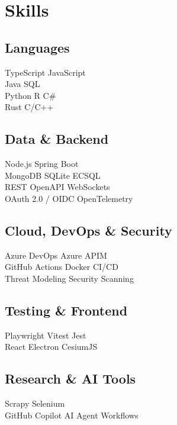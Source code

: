 \documentclass[]{deedy-resume-openfont}
\begin{document}
\begin{minipage}[t]{0.33\textwidth}

\section{Skills}
\subsection{Languages}
TypeScript \textbullet{} JavaScript \\
Java \textbullet{} SQL \\
Python \textbullet{} R \textbullet{} C\# \\
Rust \textbullet{} C/C++ \\
\sectionsep
\subsection{Data \& Backend}
Node.js \textbullet{} Spring Boot \\
MongoDB \textbullet{} SQLite \textbullet{} ECSQL \\
REST \textbullet{} OpenAPI \textbullet{} WebSockets \\
OAuth 2.0 / OIDC \textbullet{} OpenTelemetry \\
\sectionsep
\subsection{Cloud, DevOps \& Security}
Azure DevOps \textbullet{} Azure APIM \\
GitHub Actions \textbullet{} Docker \textbullet{} CI/CD \\
Threat Modeling \textbullet{} Security Scanning \\
\sectionsep
\subsection{Testing \& Frontend}
Playwright \textbullet{} Vitest \textbullet{} Jest \\
React \textbullet{} Electron \textbullet{} CesiumJS \\
\sectionsep
\subsection{Research \& AI Tools}
Scrapy \textbullet{} Selenium \\
GitHub Copilot \textbullet{} AI Agent Workflows \\
\sectionsep

\end{minipage}
\end{document}
